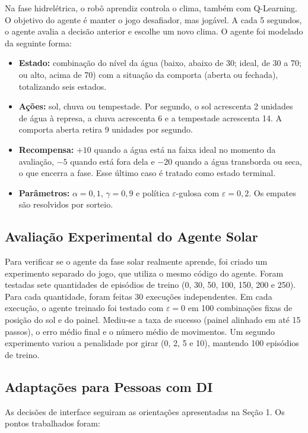 \documentclass[12pt,a4paper]{article}
\begin{document}
Na fase hidrelétrica, o robô aprendiz controla o clima, também com Q-Learning. O objetivo do agente é manter o jogo desafiador, mas jogável. A cada 5 segundos, o agente avalia a decisão anterior e escolhe um novo clima. O agente foi modelado da seguinte forma:

\begin{itemize}
\item \textbf{Estado:} combinação do nível da água (baixo, abaixo de 30; ideal, de 30 a 70; ou alto, acima de 70) com a situação da comporta (aberta ou fechada), totalizando seis estados.
\item \textbf{Ações:} sol, chuva ou tempestade. Por segundo, o sol acrescenta 2 unidades de água à represa, a chuva acrescenta 6 e a tempestade acrescenta 14. A comporta aberta retira 9 unidades por segundo.
\item \textbf{Recompensa:} $+10$ quando a água está na faixa ideal no momento da avaliação, $-5$ quando está fora dela e $-20$ quando a água transborda ou seca, o que encerra a fase. Esse último caso é tratado como estado terminal.
\item \textbf{Parâmetros:} $\alpha = 0{,}1$, $\gamma = 0{,}9$ e política $\varepsilon$-gulosa com $\varepsilon = 0{,}2$. Os empates são resolvidos por sorteio.
\end{itemize}

\subsection{Avaliação Experimental do Agente Solar}

Para verificar se o agente da fase solar realmente aprende, foi criado um experimento separado do jogo, que utiliza o mesmo código do agente. Foram testadas sete quantidades de episódios de treino (0, 30, 50, 100, 150, 200 e 250). Para cada quantidade, foram feitas 30 execuções independentes. Em cada execução, o agente treinado foi testado com $\varepsilon = 0$ em 100 combinações fixas de posição do sol e do painel. Mediu-se a taxa de sucesso (painel alinhado em até 15 passos), o erro médio final e o número médio de movimentos. Um segundo experimento variou a penalidade por girar (0, 2, 5 e 10), mantendo 100 episódios de treino.

\subsection{Adaptações para Pessoas com DI}

As decisões de interface seguiram as orientações apresentadas na Seção 1. Os pontos trabalhados foram:
\end{document}
